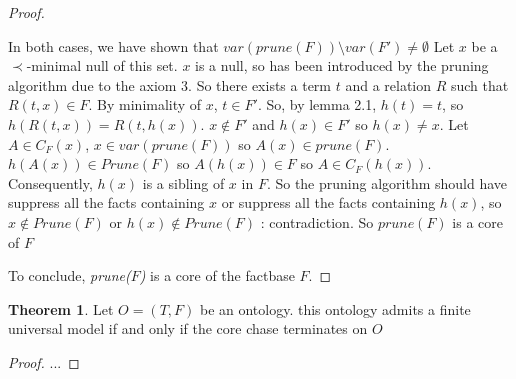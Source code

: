 \documentclass{article}
\theoremstyle{definition}
\newtheorem{theorem}{Theorem}[section]
\theoremstyle{remark}
\begin{document}
\begin{proof}
\begin{itemize}
In both cases, we have shown that $var(prune(F))\setminus var(F') \neq \emptyset$ Let $x$ be a $\prec$-minimal null of this set. $x$ is a null, so has been introduced by the pruning algorithm due to the axiom 3. So there exists a term $t$ and a relation $R$ such that $R(t,x) \in F$. By minimality of $x$, $t \in F'$. So, by lemma 2.1, $h(t) = t$, so $h(R(t,x)) = R(t,h(x))$. $x \notin F'$ and $h(x) \in F'$ so $h(x) \neq x$. Let $A \in C_{F}(x)$, $x \in var(prune(F))$ so $A(x) \in prune(F)$. $h(A(x)) \in Prune(F)$ so $A(h(x)) \in F$ so $A \in C_F(h(x))$. Consequently, $h(x)$ is a sibling of $x$ in $F$. So the pruning algorithm should have suppress all the facts containing $x$ or suppress all the facts containing $h(x)$, so $x \notin Prune(F)$ or $h(x) \notin Prune(F)$ : contradiction. So $prune(F)$ is a core of $F$
\end{itemize}
To conclude, \emph{prune($F$)} is a core of the factbase $F$.
\end{proof}

\begin{theorem} 
Let $O = (T,F)$ be an ontology. this ontology admits a finite universal model if and only if the core chase terminates on $O$
\end{theorem}

\begin{proof}
...
\end{proof}

%
%
\end{document}
